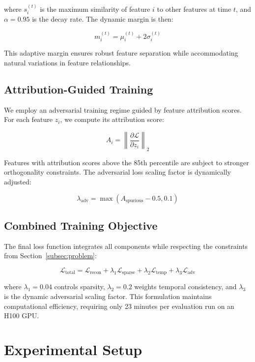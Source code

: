 \documentclass{article} %
\begin{document}
where $s_i^{(t)}$ is the maximum similarity of feature $i$ to other features at time $t$, and $\alpha=0.95$ is the decay rate. The dynamic margin is then:

\begin{equation}
    m_i^{(t)} = \mu_i^{(t)} + 2\sigma_i^{(t)}
\end{equation}

This adaptive margin ensures robust feature separation while accommodating natural variations in feature relationships.

\subsection{Attribution-Guided Training}
We employ an adversarial training regime guided by feature attribution scores. For each feature $z_i$, we compute its attribution score:

\begin{equation}
    A_i = \left\|\frac{\partial \mathcal{L}}{\partial z_i}\right\|_2
\end{equation}

Features with attribution scores above the 85th percentile are subject to stronger orthogonality constraints. The adversarial loss scaling factor is dynamically adjusted:

\begin{equation}
    \lambda_\text{adv} = \max(A_\text{spurious} - 0.5, 0.1)
\end{equation}

\subsection{Combined Training Objective}
The final loss function integrates all components while respecting the constraints from Section~\ref{subsec:problem}:

\begin{equation}
    \mathcal{L}_\text{total} = \mathcal{L}_\text{recon} + \lambda_1\mathcal{L}_\text{sparse} + \lambda_2\mathcal{L}_\text{temp} + \lambda_3\mathcal{L}_\text{adv}
\end{equation}

where $\lambda_1=0.04$ controls sparsity, $\lambda_2=0.2$ weights temporal consistency, and $\lambda_3$ is the dynamic adversarial scaling factor. This formulation maintains computational efficiency, requiring only 23 minutes per evaluation run on an H100 GPU.

\section{Experimental Setup}
\label{sec:experimental}
\end{document}

